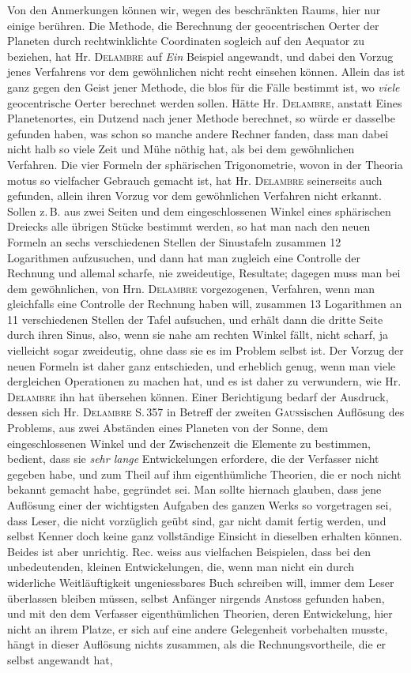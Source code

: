 Von den Anmerkungen können wir, wegen des beschränkten Raums, hier nur einige berühren. Die Methode, die Berechnung der geocentrischen Oerter der Planeten durch rechtwinklichte Coordinaten sogleich auf den Aequator zu beziehen, hat Hr. \textsc{Delambre} auf \emph{Ein} Beispiel angewandt, und dabei den Vorzug jenes Verfahrens vor dem gewöhnlichen nicht recht einsehen können. Allein das ist ganz gegen den Geist jener Methode, die blos für die Fälle bestimmt ist, wo \emph{viele} geocentrische Oerter berechnet werden sollen. Hätte Hr. \textsc{Delambre}, anstatt Eines Planetenortes, ein Dutzend nach jener Methode berechnet, so würde er dasselbe gefunden haben, was schon so manche andere Rechner fanden, dass man dabei nicht halb so viele Zeit und Mühe nöthig hat, als bei dem gewöhnlichen Verfahren. Die vier Formeln der sphärischen Trigonometrie, wovon in der Theoria motus so vielfacher Gebrauch gemacht ist, hat Hr. \textsc{Delambre} seinerseits auch gefunden, allein ihren Vorzug vor dem gewöhnlichen Verfahren nicht erkannt. Sollen z.\,B. aus zwei Seiten und dem eingeschlossenen Winkel eines sphärischen Dreiecks alle übrigen Stücke bestimmt werden, so hat man nach den neuen Formeln an sechs verschiedenen Stellen der Sinustafeln zusammen 12 Logarithmen aufzusuchen, und dann hat man zugleich eine Controlle der Rechnung und allemal scharfe, nie zweideutige, Resultate; dagegen muss man bei dem gewöhnlichen, von Hrn. \textsc{Delambre} vorgezogenen, Verfahren, wenn man gleichfalls eine Controlle der Rechnung haben will, zusammen 13 Logarithmen an 11 verschiedenen Stellen der Tafel aufsuchen, und erhält dann die dritte Seite durch ihren Sinus, also, wenn sie nahe am rechten Winkel fällt, nicht scharf, ja vielleicht sogar zweideutig, ohne dass sie es im Problem selbst ist. Der Vorzug der neuen Formeln ist daher ganz entschieden, und erheblich genug, wenn man viele dergleichen Operationen zu machen hat, und es ist daher zu verwundern, wie Hr. \textsc{Delambre} ihn hat übersehen können. Einer Berichtigung bedarf der Ausdruck, dessen sich Hr. \textsc{Delambre} S.\,357 in Betreff der zweiten \textsc{Gauss}ischen Auflösung des Problems, aus zwei Abständen eines Planeten von der Sonne, dem eingeschlossenen Winkel und der Zwischenzeit die Elemente zu bestimmen, bedient, dass sie \emph{sehr lange} Entwickelungen erfordere, die der Verfasser nicht gegeben habe, und zum Theil auf ihm eigenthümliche Theorien, die er noch nicht bekannt gemacht habe, gegründet sei. Man sollte hiernach glauben, dass jene Auflösung einer der wichtigsten Aufgaben des ganzen Werks so vorgetragen sei, dass Leser, die nicht vorzüglich geübt sind, gar nicht damit fertig werden, und selbst Kenner doch keine ganz vollständige Einsicht in dieselben erhalten können. Beides ist aber unrichtig. Rec. weiss aus vielfachen Beispielen, dass bei den unbedeutenden, kleinen Entwickelungen, die, wenn man nicht ein durch widerliche Weitläuftigkeit ungeniessbares Buch schreiben will, immer dem Leser überlassen bleiben müssen, selbst Anfänger nirgends Anstoss gefunden haben, und mit den dem Verfasser eigenthümlichen Theorien, deren Entwickelung, hier nicht an ihrem Platze, er sich auf eine andere Gelegenheit vorbehalten musste, hängt in dieser Auflösung nichts zusammen, als die Rechnungsvortheile, die er selbst angewandt hat, 